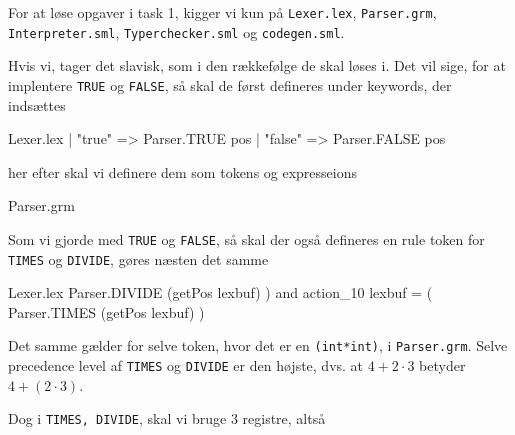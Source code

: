 \documentclass[11pt,a4paper,oneside]{report}
\begin{document}

\setcounter{page}{0}
\renewcommand\thepage{\roman{page}}





\setcounter{page}{1}
\renewcommand\thepage{\arabic{page}}


For at løse opgaver i task 1, kigger vi kun på \texttt{Lexer.lex}, \texttt{Parser.grm}, \texttt{Interpreter.sml}, \texttt{Typerchecker.sml} og \texttt{codegen.sml}.

Hvis vi, tager det slavisk, som i den rækkefølge de skal løses i. Det vil sige, for at implentere \texttt{TRUE} og \texttt{FALSE}, så skal de først defineres under keywords, der indsættes

\begin{code}[firstnumber=42]{Lexer.lex}
       | "true"         => Parser.TRUE pos
       | "false"        => Parser.FALSE pos
\end{code}

her efter skal vi definere dem som tokens og  expresseions

\begin{code}[firstnumber=13]{Parser.grm}
\end{code}

Som vi gjorde med \texttt{TRUE} og \texttt{FALSE}, så skal der også defineres en rule token for \texttt{TIMES} og \texttt{DIVIDE}, gøres næsten det samme

\begin{code}[firstnumber=133]{Lexer.lex}
 Parser.DIVIDE (getPos lexbuf) )
 and action_10 lexbuf = (
 Parser.TIMES  (getPos lexbuf) )
\end{code}

Det samme gælder for selve token, hvor det er en \texttt{(int*int)}, i \texttt{Parser.grm}. Selve precedence level af \texttt{TIMES} og \texttt{DIVIDE} er den højste, dvs. at $4 + 2 \cdot 3$ betyder $4 + (2 \cdot 3)$.

Dog i \texttt{TIMES, DIVIDE}, skal vi bruge 3 registre, altså

\end{document}
